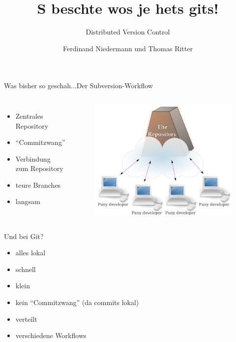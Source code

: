 \documentclass{beamer}
\author{Ferdinand Niedermann und Thomas Ritter}
\title{S beschte wos je hets \textbf{git}s!}
\subtitle{Distributed Version Control}
\begin{document}
\begin{frame}
 \maketitle
\end{frame}



\begin{frame}{Was bisher so geschah...}{Der Subversion-Workflow}

  \begin{columns}

      \begin{itemize}
    	\item Zentrales Repository
	\item ``Commitzwang''
	\item Verbindung zum Repository
	\item teure Branches
	\item langsam
      \end{itemize}

      \begin{figure}
       \includegraphics[width=1\textwidth]{./images/holy-repo.png}
      \end{figure}

  \end{columns}
\end{frame}

\begin{frame}[<+->]{Und bei Git?}{}
  \begin{itemize}
    \item alles lokal
    \item schnell
    \item klein
    \item kein ``Commitzwang'' (da commits lokal)
    \item verteilt
    \item verschiedene Workflows
  \end{itemize}
\end{frame}
\end{document}
